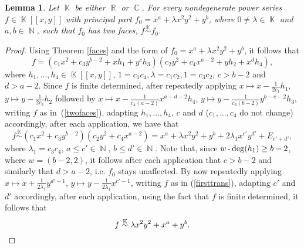 \documentclass[noend]{amsproc}
\newtheorem{lemma}[theorem]{Lemma}
\theoremstyle{definition}
\DeclareMathOperator{\N}{\mathbb{N}}
\DeclareMathOperator{\R}{\mathbb{R}}
\DeclareMathOperator{\C}{\mathbb{C}}
\DeclareMathOperator{\K}{\mathbb{K}}
\DeclareMathOperator{\dash}{\textnormal{-}}
\begin{document}
\begin{lemma}\label{principalpart}
Let $\K$ be either $\R$ or $\C$. For every nondegenerate power series $f\in\K[[x,y]]$ with principal part $f_0=x^a+\lambda x^2y^2+y^b$, where $0\neq\lambda\in\K$ and $a,b\in\N$, such that $f_0$ has two faces, $f\overset{\K}\sim f_0$.
\end{lemma}
\begin{proof}
Using Theorem \ref{faces} and the form of $f_0=x^a+\lambda x^2y^2+y^b$, it follows that 
\begin{equation}\label{twofaces}
f=(c_1x^2+c_3y^{b-2}+xh_1+y^ch_3)(c_2y^2+c_4x^{a-2}+yh_2+x^dh_4),
\end{equation}
where $h_1,\ldots,h_4\in\K[[x,y]]$, $1=c_1c_4, \lambda=c_1c_2, 1=c_3c_2$, $c>b-2$ and $d>a-2$. Since $f$ is finite determined, after repeatedly applying $x\mapsto x-\frac{1}{2c_1}h_1$, $y\mapsto y-\frac{1}{2c_2}h_2$ followed by $x\mapsto x-\frac{1}{c_4(a-2)}x^{a-d-2}h_4$, $y\mapsto y-\frac{1}{c_3(b-2)}y^{b-c-2} h_3$, writing $f$ as in~(\ref{twofaces}), adapting $h_1,\ldots,h_4$, $c$ and $d$ ($c_1,\ldots,c_4$ do not change) accordingly, after each application, we have that 
\begin{equation}
f\overset{\K}\sim (c_1x^2+c_3y^{b-2})(c_2y^2+c_4x^{a-2})
=x^a+\lambda x^2y^2+y^b+2\lambda_1x^{c'}y^{d'}+E_{c'+d'},\label{firsttrans}
\end{equation}
where $\lambda_1=c_3c_4$, $a\le c'\in\N$, $b\le d'\in\N$. Note that, since $w\dash\deg(h_1)\ge b-2$, where $w=(b-2,2)$, it follows after each application that $c>b-2$ and similarly that $d>a-2$, i.e. $f_0$ stays unaffected. By now repeatedly applying $x\mapsto x+\frac{1}{2\lambda_1}y^{d'-1}$, $y\mapsto y-\frac{1}{2\lambda_1}x^{c'-1}$, writing $f$ as in (\ref{firsttrans}), adapting $c'$ and $d'$ accordingly, after each application, using the fact that $f$ is finite determined, it follows that
\[f\overset{\K}\sim \lambda x^2y^2+x^a+y^b.\qedhere\]
\end{proof}
\end{document}

